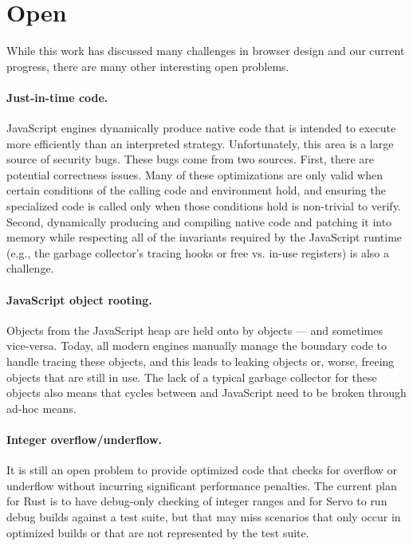 
\section{Open}
\label{sec:open}
While this work has discussed many challenges in browser design and our current progress,
there are many other interesting open problems.

\paragraph{Just-in-time code.} JavaScript engines dynamically produce native code that is
intended to execute more efficiently than an interpreted strategy.
Unfortunately, this area is a large source of security bugs.
These bugs come from two sources.
First, there are potential correctness issues.
Many of these optimizations are only valid when certain conditions of the calling
code and environment hold, and ensuring the specialized code is called only when those
conditions hold is non-trivial to verify.
Second, dynamically producing and compiling native code and patching it into memory
while respecting all of the invariants required by the JavaScript runtime (e.g., the
garbage collector's tracing hooks or free vs. in-use registers) is also a challenge.

\paragraph{JavaScript object rooting.} Objects from the JavaScript
heap  are held onto by \Cplusplus{} objects --- and sometimes vice-versa.
Today, all modern engines manually manage the boundary code to handle tracing
these objects, and this leads to leaking objects or, worse, freeing objects that
are still in use.
The lack of a typical garbage collector for these objects also means that cycles
between \Cplusplus{} and JavaScript need to be broken through ad-hoc means.

\paragraph{Integer overflow/underflow.} It is still an open problem
to provide optimized code that checks for overflow or underflow without
incurring significant performance penalties.
The current plan for Rust is to have debug-only checking of integer ranges
and for Servo to run debug builds against a test suite, but that may miss
scenarios that only occur in optimized builds or that are not represented
by the test suite.

